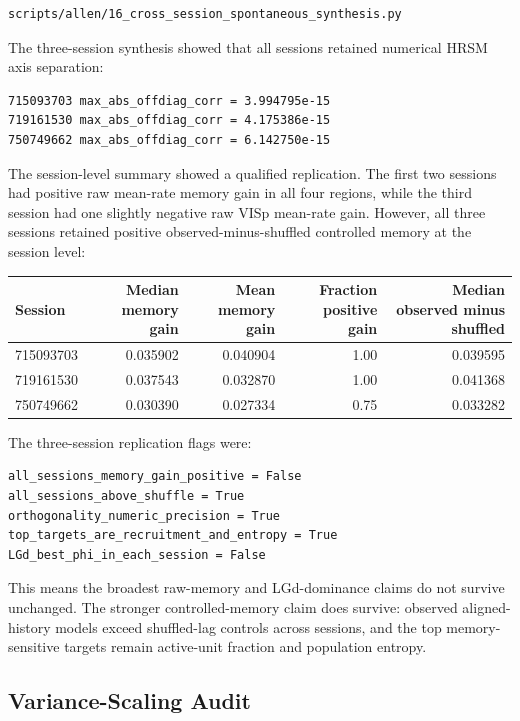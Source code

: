 \begin{verbatim}
scripts/allen/16_cross_session_spontaneous_synthesis.py
\end{verbatim}

The three-session synthesis showed that all sessions retained numerical HRSM axis separation:

\begin{verbatim}
715093703 max_abs_offdiag_corr = 3.994795e-15
719161530 max_abs_offdiag_corr = 4.175386e-15
750749662 max_abs_offdiag_corr = 6.142750e-15
\end{verbatim}

The session-level summary showed a qualified replication. The first two sessions had positive raw mean-rate memory gain in all four regions, while the third session had one slightly negative raw VISp mean-rate gain. However, all three sessions retained positive observed-minus-shuffled controlled memory at the session level:

\begin{center}
\begin{tabular}{lrrrr}
\hline
Session & Median memory gain & Mean memory gain & Fraction positive gain & Median observed minus shuffled \\
\hline
715093703 & 0.035902 & 0.040904 & 1.00 & 0.039595 \\
719161530 & 0.037543 & 0.032870 & 1.00 & 0.041368 \\
750749662 & 0.030390 & 0.027334 & 0.75 & 0.033282 \\
\hline
\end{tabular}
\end{center}

The three-session replication flags were:

\begin{verbatim}
all_sessions_memory_gain_positive = False
all_sessions_above_shuffle = True
orthogonality_numeric_precision = True
top_targets_are_recruitment_and_entropy = True
LGd_best_phi_in_each_session = False
\end{verbatim}

This means the broadest raw-memory and LGd-dominance claims do not survive unchanged. The stronger controlled-memory claim does survive: observed aligned-history models exceed shuffled-lag controls across sessions, and the top memory-sensitive targets remain active-unit fraction and population entropy.

\subsection{Variance-Scaling Audit}

